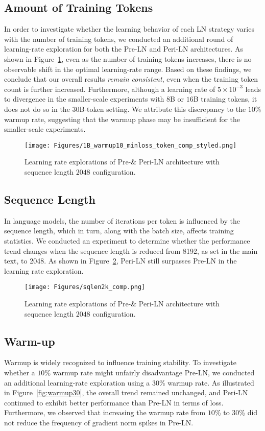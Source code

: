 \subsection{Amount of Training Tokens}
In order to investigate whether the learning behavior of each LN strategy varies with the number of training tokens, we conducted an additional round of learning-rate exploration for both the Pre-LN and Peri-LN architectures. As shown in Figure~\ref{fig:tokensweep}, even as the number of training tokens increases, there is no observable shift in the optimal learning-rate range. Based on these findings, we conclude that our overall results \emph{remain consistent}, even when the training token count is further increased. Furthermore, although a learning rate of \(5\times10^{-3}\) leads to divergence in the smaller-scale experiments with $8$B or $16$B training tokens, it does not do so in the $30$B-token setting. We attribute this discrepancy to the $10$\% warmup rate, suggesting that the warmup phase may be insufficient for the smaller-scale experiments.

\begin{figure}[ht!]
    \centering
    \texttt{[image: Figures/1B\_warmup10\_minloss\_token\_comp\_styled.png]} 
    \caption{Learning rate explorations of Pre-\& Peri-LN architecture with sequence length $2048$ configuration.}
    \label{fig:tokensweep}
\end{figure}


\subsection{Sequence Length}
In language models, the number of iterations per token is influenced by the sequence length, which in turn, along with the batch size, affects training statistics. We conducted an experiment to determine whether the performance trend changes when the sequence length is reduced from 8192, as set in the main text, to 2048. As shown in Figure~\ref{fig:sqlen2k}, Peri-LN still surpasses Pre-LN in the learning rate exploration.

\begin{figure}[ht!]
    \centering
    \texttt{[image: Figures/sqlen2k\_comp.png]} 
    \caption{Learning rate explorations of Pre-\& Peri-LN architecture with sequence length $2048$ configuration.}
    \label{fig:sqlen2k}
\end{figure}

\newpage

\subsection{Warm-up}
Warmup is widely recognized to influence training stability. To investigate whether a $10$\% warmup rate might unfairly disadvantage Pre-LN, we conducted an additional learning-rate exploration using a $30$\% warmup rate. As illustrated in Figure~\ref{fig:warmup30}, the overall trend remained unchanged, and Peri-LN continued to exhibit better performance than Pre-LN in terms of loss. Furthermore, we observed that increasing the warmup rate from $10$\% to $30$\% did not reduce the frequency of gradient norm spikes in Pre-LN.

